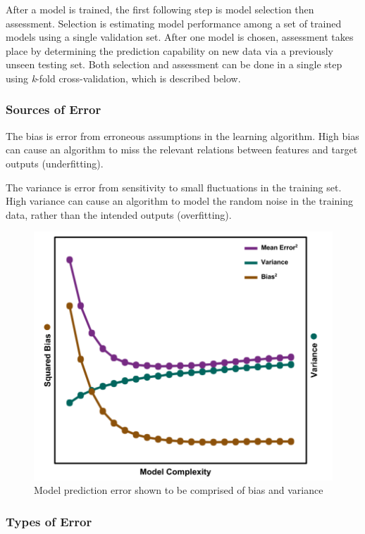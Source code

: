 After a model is trained, the first following step is model selection then
assessment.  Selection is estimating model performance among a set of trained
models using a single validation set.  After one model is chosen, assessment
takes place by determining the prediction capability on new data via a
previously unseen testing set. Both selection and assessment can be done in a
single step using \textit{k}-fold cross-validation, which is described below.

\subsubsection{Sources of Error} 

The bias is error from erroneous
assumptions in the learning algorithm. High bias can cause an algorithm to miss
the relevant relations between features and target outputs (underfitting).  

The
variance is error from sensitivity to small fluctuations in the training set.
High variance can cause an algorithm to model the random noise in the training
data, rather than the intended outputs (overfitting).

\begin{figure}[!htb]
  \includegraphics[width=\linewidth]{./chapters/litrev/BVtradeoff.png}
  \caption{Model prediction error shown to be comprised of bias and variance}
  \label{fig:bvtradeoff}
\end{figure}

\subsubsection{Types of Error}

